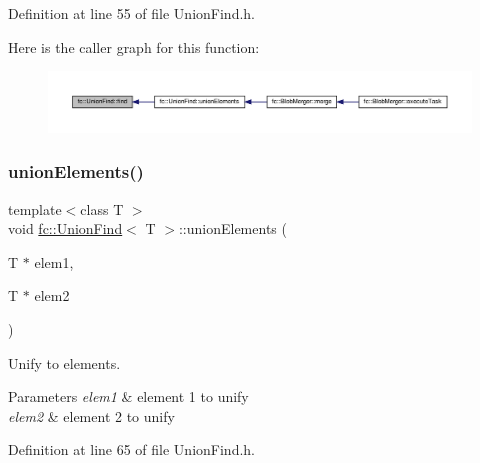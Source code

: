 Definition at line 55 of file Union\+Find.\+h.

Here is the caller graph for this function\+:
\nopagebreak
\begin{figure}[H]
\begin{center}
\leavevmode
\includegraphics[width=350pt]{dd/d13/classfc_1_1UnionFind_afea42f5456053c1185991449afeedb01_icgraph}
\end{center}
\end{figure}
\mbox{\label{classfc_1_1UnionFind_af2a4f58739f658a16006fb023a6fa9fc}} 
\subsubsection{\texorpdfstring{union\+Elements()}{unionElements()}}
{\footnotesize\ttfamily template$<$class T $>$ \\
void \hyperlink{classfc_1_1UnionFind}{fc\+::\+Union\+Find}$<$ T $>$\+::union\+Elements (\begin{DoxyParamCaption}\item[{T $\ast$}]{elem1,  }\item[{T $\ast$}]{elem2 }\end{DoxyParamCaption})\hspace{0.3cm}{\ttfamily [inline]}}



Unify to elements. 


\begin{DoxyParams}{Parameters}
{\em elem1} & element 1 to unify \\
\hline
{\em elem2} & element 2 to unify \\
\hline
\end{DoxyParams}


Definition at line 65 of file Union\+Find.\+h.

